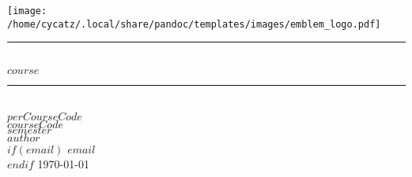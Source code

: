 \usepackage{graphicx}
\begin{titlepage}
	\centering
	\vspace*{0.2cm}
	\texttt{[image: /home/cycatz/.local/share/pandoc/templates/images/emblem\_logo.pdf]}\\[0.6cm] %
	\rule{\linewidth}{0.2 mm} \\[0.4 cm]
	{\huge $course$}\\
	\rule{\linewidth}{0.3 mm} \\[1.5 cm]
	\textsc{\Large $perCourseCode$}\\[0.5 cm]				%
	\textsc{\large $courseCode$}\\[0.5 cm]				%
	\textsc{\large $semester$}\\[0.5 cm]				%
	\vspace*{\fill}
	\large{$author$}\\
	$if(email)$
	\large{$email$}\\
	$endif$
	\large{\today}
\end{titlepage}

